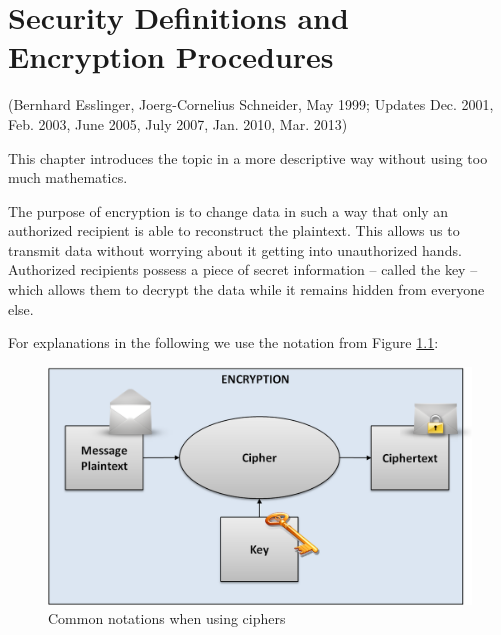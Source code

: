 %
%

\makeatletter \renewcommand{\thepage}{~\csname @arabic\endcsname \c@page~} \makeatother
\hypertarget{Kapitel_1}{}
\chapter{Security Definitions and Encryption Procedures}
\label{Label_Kapitel_1}
(Bernhard Esslinger, Joerg-Cornelius Schneider, May 1999; Updates Dec. 2001, Feb. 2003, June 2005, July 2007, Jan. 2010, Mar. 2013)

This chapter introduces the topic in a more descriptive way without using too much mathematics.

The purpose of encryption  is to change data in such a way
that only an authorized recipient is able to reconstruct the plaintext. This
allows us to transmit data without worrying about it getting into unauthorized
hands. Authorized recipients possess a piece of secret information -- called the
key -- which allows them to decrypt the data while it remains hidden from
everyone else.%

For explanations in the following we use the notation from 
Figure \ref{Generic-Notations-when-Encrypting}:
\begin{figure}[ht]
\begin{center}
\includegraphics[scale=0.7]{figures/Generic-Notation-Encryption_en.png}
\caption{Common notations when using ciphers} 
\label{Generic-Notations-when-Encrypting}
\end{center}
\end{figure}


